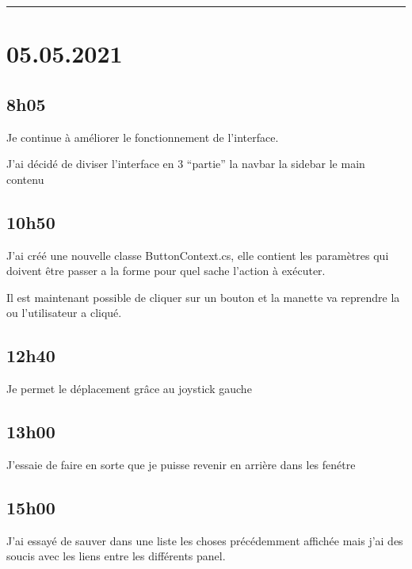 \documentclass[a4paper,12pt,french]{sphinxmanual}
\begin{document}
\bigskip\hrule\bigskip



\section{05.05.2021}
\label{\detokenize{logbook:id70}}

\subsection{8h05}
\label{\detokenize{logbook:id71}}
\sphinxAtStartPar
Je continue à améliorer le fonctionnement de l’interface.

\sphinxAtStartPar
J’ai décidé de diviser l’interface en 3 “partie”
la navbar
la sidebar
le main contenu

\sphinxAtStartPar
{}


\subsection{10h50}
\label{\detokenize{logbook:id72}}
\sphinxAtStartPar
J’ai créé une nouvelle classe ButtonContext.cs, elle contient les paramètres qui doivent être passer a la forme pour quel sache l’action à exécuter.

\sphinxAtStartPar
Il est maintenant possible de cliquer sur un bouton et la manette va reprendre la ou l’utilisateur a cliqué.


\subsection{12h40}
\label{\detokenize{logbook:id73}}
\sphinxAtStartPar
Je permet le déplacement grâce au joystick gauche


\subsection{13h00}
\label{\detokenize{logbook:id74}}
\sphinxAtStartPar
J’essaie de faire en sorte que je puisse revenir en arrière dans les fenétre


\subsection{15h00}
\label{\detokenize{logbook:id75}}
\sphinxAtStartPar
J’ai essayé de sauver dans une liste les choses précédemment affichée mais j’ai des soucis avec les liens entre les différents panel.
\end{document}
